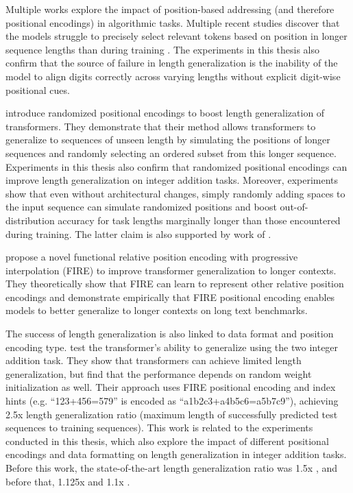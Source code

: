 Multiple works explore the impact of position-based addressing (and therefore positional encodings) in algorithmic tasks. Multiple recent studies discover that the models struggle to precisely select relevant tokens based on position in longer sequence lengths than during training \parencite{ebrahimi_your_2024,shen_positional_2023,zhao_length_2024,zhou_what_2023,yehudai_when_2024}. The experiments in this thesis also confirm that the source of failure in length generalization is the inability of the model to align digits correctly across varying lengths without explicit digit-wise positional cues.

\cite{ruoss_randomized_2023} introduce randomized positional encodings to boost length generalization of transformers. They demonstrate that their method allows transformers to generalize to sequences of unseen length by simulating the positions of longer sequences and randomly selecting an ordered subset from this longer sequence. Experiments in this thesis also confirm that randomized positional encodings can improve length generalization on integer addition tasks. Moreover, experiments show that even without architectural changes, simply randomly adding spaces to the input sequence can simulate randomized positions and boost out-of-distribution accuracy for task lengths marginally longer than those encountered during training. The latter claim is also supported by work of \cite{shen_positional_2023}.

\cite{li_functional_2024} propose a novel functional relative position encoding with progressive interpolation (FIRE) to improve transformer generalization to longer contexts. They theoretically show that FIRE can learn to represent other relative position encodings and demonstrate empirically that FIRE positional encoding enables models to better generalize to longer contexts on long text benchmarks.

The success of length generalization is also linked to data format and position encoding type. \cite{zhou_transformers_2024} test the transformer's ability to generalize using the two integer addition task. They show that transformers can achieve limited length generalization, but find that the performance depends on random weight initialization as well. Their approach uses FIRE positional encoding and index hints (e.g. ``123+456=579'' is encoded as ``a1b2c3+a4b5c6=a5b7c9''), achieving 2.5x length generalization ratio (maximum length of successfully predicted test sequences to training sequences). This work is related to the experiments conducted in this thesis, which also explore the impact of different positional encodings and data formatting on length generalization in integer addition tasks. Before this work, the state-of-the-art length generalization ratio was 1.5x \parencite{zhou_what_2023}, and before that, 1.125x \parencite{kazemnejad_impact_2023} and 1.1x \parencite{shen_positional_2023}.

